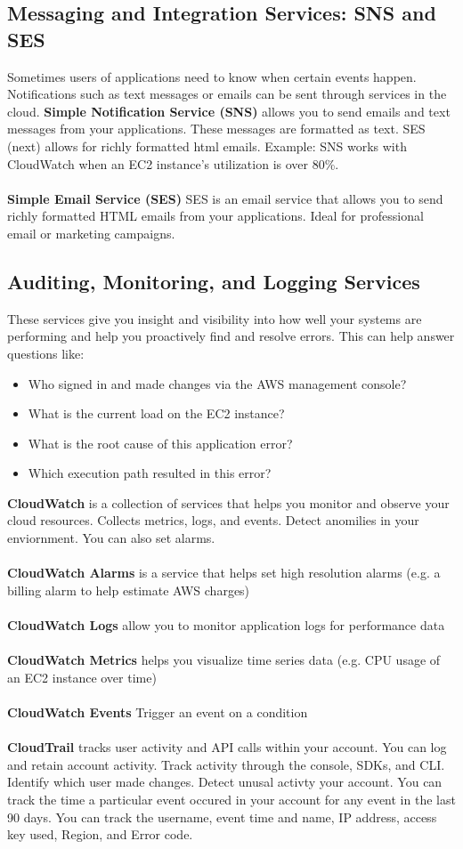 \documentclass{article}%
\begin{document}
\subsection{Messaging and Integration Services: SNS and SES} Sometimes users of applications need to know when certain events happen. Notifications such as text messages or emails can be sent through services in the cloud.
\textbf{Simple Notification Service (SNS)} allows you to send emails and text messages from your applications. These messages are formatted as text. SES (next) allows for richly formatted html emails. Example: SNS works with CloudWatch when an EC2 instance's utilization is over 80\%. \\ \\
\textbf{Simple Email Service (SES)} SES is an email service that allows you to send richly formatted HTML emails from your applications. Ideal for professional email or marketing campaigns. 
\subsection{Auditing, Monitoring, and Logging Services}
These services give you insight and visibility into how well your systems are performing and help you proactively find and resolve errors. This can help answer questions like:
\begin{itemize}
    \item Who signed in and made changes via the AWS management console?
    \item What is the current load on the EC2 instance?
    \item What is the root cause of this application error?
    \item Which execution path resulted in this error?
\end{itemize}
\textbf{CloudWatch} is a collection of services that helps you monitor and observe your cloud resources. Collects metrics, logs, and events. Detect anomilies in your enviornment. You can also set alarms. \\ \\
\textbf{CloudWatch Alarms} is a service that helps set high resolution alarms (e.g. a billing alarm to help estimate AWS charges)\\ \\
\textbf{CloudWatch Logs} allow you to monitor application logs for performance data \\ \\
\textbf{CloudWatch Metrics} helps you visualize time series data (e.g. CPU usage of an EC2 instance over time) \\ \\
\textbf{CloudWatch Events} Trigger an event on a condition  \\ \\
\textbf{CloudTrail} tracks user activity and API calls within your account. You can log and retain account activity. Track activity through the console, SDKs, and CLI. Identify which user made changes. Detect unusal activty your account. You can track the time a particular event occured in your account for any event in the last 90 days.
You can track the username, event time and name, IP address, access key used, Region, and Error code. 
\end{document}
